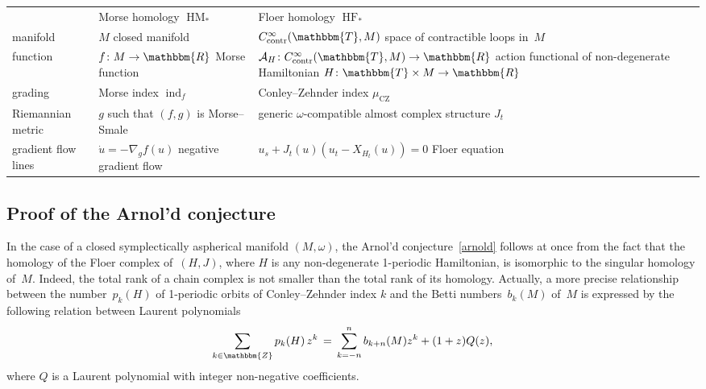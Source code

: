 \documentclass[12pt,twoside]{amsart}
\theoremstyle{plain}
\numberwithin{figure}{section}
\numberwithin{equation}{section}
\def\ind{\operatorname{ind}}
\def\sCZ{ {\scriptscriptstyle\operatorname{CZ}}}
\def\HM{\operatorname{HM}}
\def\HF{\operatorname{HF}}
\def\go{\omega}
\def\ca{{\mathcal A}}
\def\RR{\mathbbm{R}}
\def\TT{\mathbbm{T}}
\def\ZZ{\mathbbm{Z}}
\begin{document}
\begin{center}
    \begin{tabular}{ | p{2.4cm} || p{4cm} | p{6.5cm} |}
    \hline
      & Morse homology $\HM_*$ & Floer homology $\HF_*$  \\ \hhline{|=#=|=|}
    manifold & $M$ closed manifold &  $C^\infty_{\mathrm{contr}} (\TT,M)$ \newline space of contractible loops in~$M$
                                            \\ \hline
    function & $f \colon M \to \RR$ \newline Morse function & $\ca_H \colon C^\infty_{\mathrm{contr}} (\TT,M) \to \RR$ \newline action functional of non-degenerate Hamiltonian $H \colon \TT \times M \to \RR$
                                            \\ \hline
    grading & Morse index $\ind_f$ & Conley--Zehnder index $\mu_{\sCZ}$
                                            \\ \hline						
    Riemannian metric & $g$ such that $(f,g)$ is \newline Morse--Smale & generic $\go$-compatible \newline almost complex                                          structure $J_t$    \\ \hline
    gradient flow lines & $\dot u = - \nabla_g f(u)$ \newline negative gradient flow  & $u_s + J_t(u) \left( u_t-X_{H_t}(u)\right) =0$ \newline Floer equation
                                            \\ \hline

    \end{tabular}
\end{center}


\medskip

\subsection{Proof of the Arnol'd conjecture} 
In the case of a closed symplectically aspherical manifold $(M,\omega)$, 
the Arnol'd conjecture~\ref{arnold} follows at once from the fact that the homology of the Floer complex 
of~$(H,J)$, where $H$ is any non-degenerate 1-periodic Hamiltonian, is isomorphic to the singular homology 
of~$M$. Indeed, the total rank of a chain complex is not smaller than the total rank of its homology. Actually, a more precise relationship between the number~$p_k(H)$ of 1-periodic orbits of Conley--Zehnder index $k$ and the Betti numbers~$b_k(M)$ of~$M$ is expressed by the following relation between Laurent polynomials 
\[
\sum_{k\in \ZZ} p_k(H) \, z^k \,=\, \sum_{k=-n}^{n} b_{k+n}(M)z^k + (1+z) Q(z),
\]
where $Q$ is a Laurent polynomial with integer non-negative coefficients.
\end{document}
